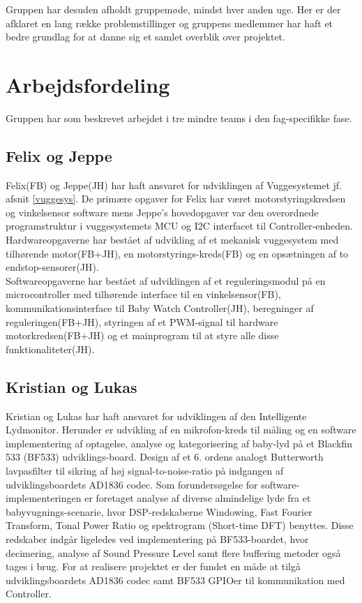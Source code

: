 Gruppen har desuden afholdt gruppemøde, mindst hver anden uge. Her er der afklaret en lang række problemstillinger og gruppens medlemmer har haft et bedre grundlag for at danne sig et samlet overblik over projektet. 

\section{Arbejdsfordeling}

Gruppen har som beskrevet arbejdet i tre mindre teams i den fag-specifikke fase. 

\subsection*{Felix og Jeppe}
Felix(FB) og Jeppe(JH) har haft ansvaret for udviklingen af Vuggesystemet jf. afsnit \vref{vuggesys}. De primære opgaver for Felix har været motorstyringskredsen og vinkelsensor software mens Jeppe's hovedopgaver var den overordnede programstruktur i vuggesystemets MCU og I2C interfacet til Controller-enheden.\\ 
Hardwareopgaverne har bestået af udvikling af et mekanisk vuggesystem med tilhørende motor(FB+JH), en motorstyrings-kreds(FB) og en opsætningen af to endstop-sensorer(JH).\\
Softwareopgaverne har bestået af udviklingen af et reguleringsmodul på en microcontroller med tilhørende interface til en vinkelsensor(FB), kommunikationsinterface til Baby Watch Controller(JH), beregninger af reguleringen(FB+JH), styringen af et PWM-signal til hardware motorkredsen(FB+JH) og et mainprogram til at styre alle disse funktionaliteter(JH). \\

\subsection*{Kristian og Lukas}
Kristian og Lukas har haft ansvaret for udviklingen af den Intelligente Lydmonitor. Herunder er udvikling af en mikrofon-kreds til måling  og en software implementering af optagelse, analyse og kategorisering af baby-lyd på et Blackfin 533 (BF533) udviklings-board. Design af et 6. ordens analogt Butterworth lavpasfilter til sikring af høj signal-to-noise-ratio på indgangen af udviklingsboardets AD1836 codec. Som forundersøgelse for software-implementeringen er foretaget analyse af diverse almindelige lyde fra et babyvugnings-scenarie, hvor DSP-redskaberne Windowing, Fast Fourier Transform, Tonal Power Ratio og spektrogram (Short-time DFT) benyttes. Disse redskaber indgår ligeledes ved implementering på BF533-boardet, hvor decimering, analyse af Sound Pressure Level samt flere buffering metoder også tages i brug. For at realisere projektet er der fundet en måde at tilgå udviklingsboardets AD1836 codec samt BF533 GPIOer til kommunikation med Controller.  \\


